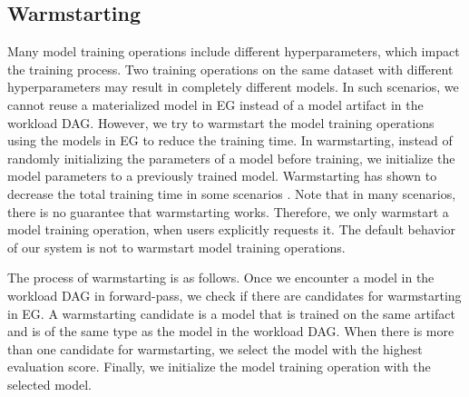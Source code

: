 \subsection{Warmstarting}
Many model training operations include different hyperparameters, which impact the training process.
Two training operations on the same dataset with different hyperparameters may result in completely different models.
In such scenarios, we cannot reuse a materialized model in EG instead of a model artifact in the workload DAG.
However, we try to warmstart the model training operations using the models in EG to reduce the training time.
In warmstarting, instead of randomly initializing the parameters of a model before training, we initialize the model parameters to a previously trained model.
Warmstarting has shown to decrease the total training time in some scenarios \cite{baylor2017tfx}.
Note that in many scenarios, there is no guarantee that warmstarting works.
Therefore, we only warmstart a model training operation, when users explicitly requests it.
The default behavior of our system is not to warmstart model training operations.

The process of warmstarting is as follows.
Once we encounter a model in the workload DAG in forward-pass, we check if there are candidates for warmstarting in EG.
A warmstarting candidate is a model that is trained on the same artifact and is of the same type as the model in the workload DAG.
When there is more than one candidate for warmstarting, we select the model with the highest evaluation score.
Finally, we initialize the model training operation with the selected model.